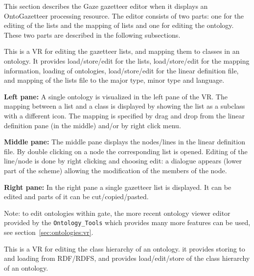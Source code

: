 
This section describes the Gaze gazetteer editor when it displays
an OntoGazetteer processing resource. The editor consists of two
parts: one for the editing of the lists and the mapping of lists and
one for editing the ontology. These two parts are described in the 
following subsections.


This is a VR for editing the gazetteer lists, and mapping them to
classes in an ontology. It provides load/store/edit for the lists,
load/store/edit for the mapping information, loading of ontologies,
load/store/edit for the linear definition file, and mapping of the lists
file to the major type, minor type and language.

\textbf{Left pane:} A single ontology is visualized in the left pane of the VR. 
The mapping between a list and a class is displayed by showing the
list as a subclass with a different icon.
The mapping is specified by drag and drop from the linear definition
pane (in the middle) and/or by right click menu. 

\textbf{Middle pane:} The middle pane displays the nodes/lines in the
linear definition file. 
By double clicking on a node the corresponding list is opened. 
Editing of the line/node is done by right clicking and choosing
edit: a dialogue appears (lower part of the scheme) allowing the
modification of the members of the node. 

\textbf{Right pane:} In the right pane a single gazetteer list is
displayed. It can be edited and parts of it can be
cut/copied/pasted. 


Note: to edit ontologies within gate, the more recent ontology viewer editor
provided by the \texttt{Ontology\_Tools} which provides many more features 
can be used, see section~\ref{sec:ontologies:vr}. 

This is a VR for editing the class hierarchy of an ontology. it
provides storing to and loading from RDF/RDFS, and provides
load/edit/store of the class hierarchy of an ontology.

